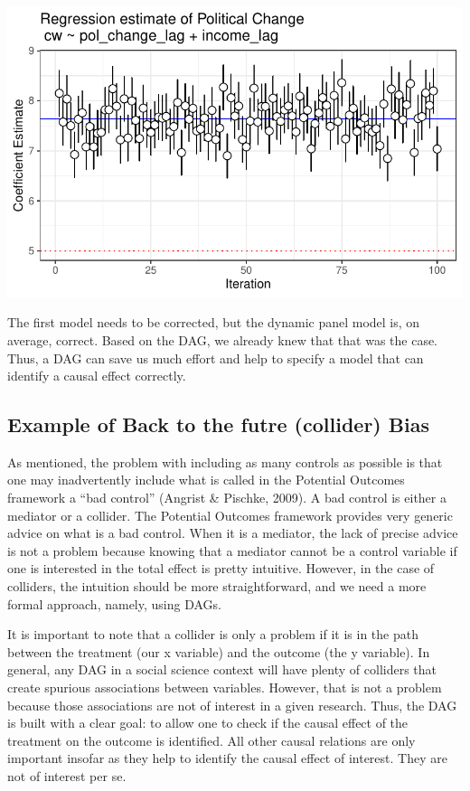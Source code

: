 \documentclass[
  super,
  preprint,
  3p]{elsarticle}
\begin{document}
\includegraphics{Papers_beware_collider_files/figure-pdf/simulation 1-2.pdf}

The first model needs to be corrected, but the dynamic panel model is,
on average, correct. Based on the DAG, we already knew that that was the
case. Thus, a DAG can save us much effort and help to specify a model
that can identify a causal effect correctly.

\hypertarget{example-of-back-to-the-futre-collider-bias}{%
\subsection{Example of Back to the futre (collider)
Bias}\label{example-of-back-to-the-futre-collider-bias}}

As mentioned, the problem with including as many controls as possible is
that one may inadvertently include what is called in the Potential
Outcomes framework a ``bad control'' (Angrist \& Pischke, 2009). A bad
control is either a mediator or a collider. The Potential Outcomes
framework provides very generic advice on what is a bad control. When it
is a mediator, the lack of precise advice is not a problem because
knowing that a mediator cannot be a control variable if one is
interested in the total effect is pretty intuitive. However, in the case
of colliders, the intuition should be more straightforward, and we need
a more formal approach, namely, using DAGs.

It is important to note that a collider is only a problem if it is in
the path between the treatment (our x variable) and the outcome (the y
variable). In general, any DAG in a social science context will have
plenty of colliders that create spurious associations between variables.
However, that is not a problem because those associations are not of
interest in a given research. Thus, the DAG is built with a clear goal:
to allow one to check if the causal effect of the treatment on the
outcome is identified. All other causal relations are only important
insofar as they help to identify the causal effect of interest. They are
not of interest per se.
\end{document}
